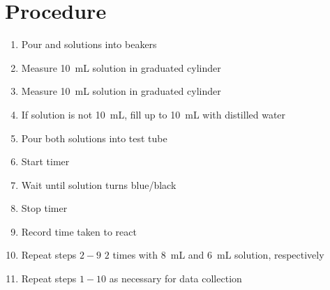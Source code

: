\documentclass[a4paper]{article}
\begin{document}
    \section{Procedure}
        \begin{enumerate}
            \item Pour  and  solutions into beakers
            \item Measure \SI{10}{\mL}  solution in graduated cylinder
            \item Measure \SI{10}{\mL}  solution in graduated cylinder
            \item If  solution is not \SI{10}{\mL}, fill up to \SI{10}{\mL} with distilled water
            \item Pour both solutions into test tube
            \item Start timer
            \item Wait until solution turns blue/black
            \item Stop timer
            \item Record time taken to react
            \item Repeat steps $2-9$ $2$ times with \SI{8}{\mL} and \SI{6}{\mL}  solution, respectively
            \item Repeat steps $1-10$ as necessary for data collection
        \end{enumerate}
    \newpage
\end{document}
